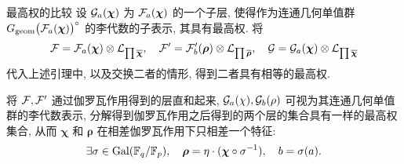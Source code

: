 \documentclass[aspectratio=169,handout]{ctexbeamer}
\newcommand\bchi{{\boldsymbol\chi}}
\newcommand\brho{{\boldsymbol\rho}}
\begin{document}
\begin{frame}{最高权的比较}
设 $\CG_a(\bchi)$ 为 $\CF_a(\bchi)$ 的一个子层, 使得作为连通几何单值群 $G_\geom\bigl(\CF_a(\bchi)\bigr)^\circ$ 的李代数的子表示, 其具有最高权.
将
\[\CF=\CF_a(\bchi)\otimes\CL_{\prod\ov \bchi},\quad
\CF'=\CF'_b(\brho)\otimes\CL_{\prod\ov \brho},\quad
\CG=\CG_a(\bchi)\otimes\CL_{\prod\ov \bchi}\]
代入上述引理中, 以及交换二者的情形, 得到二者具有相等的最高权.

将 ${\mathcal{F}},{\mathcal{F}}'$ 通过伽罗瓦作用得到的层直和起来, ${\mathcal{G}}_a(\chi),{\mathcal{G}}_b(\rho)$ 可视为其连通几何单值群的李代数表示, 分解得到伽罗瓦作用之后得到的两个层的集合具有一样的最高权集合, 从而 $\bchi$ 和 $\brho$ 在相差伽罗瓦作用下只相差一个特征:
\[\exists\sigma\in\Gal(\BF_q/\BF_p),\quad\brho=\eta\cdot(\bchi\circ \sigma^{-1}),\quad b=\sigma(a).\]
\end{frame}










\end{document}

